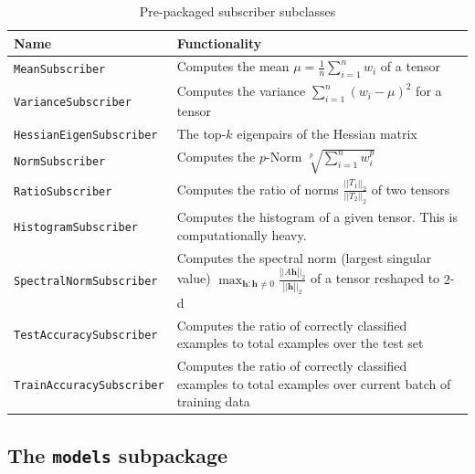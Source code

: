 \begin{table}
    \centering
    \caption{Pre-packaged subscriber subclasses}
    \label{tbl:subscribers}
    \begin{tabularx}{\textwidth}{lX}
        \toprule
        Name                             & Functionality                                                                                                                                                         \tabularnewline
        \midrule
        \texttt{MeanSubscriber}          & Computes the mean $\mu = \frac{1}{n}\sum_{i=1}^n w_i$ of a tensor                                                                                                     \tabularnewline
        \texttt{VarianceSubscriber}      & Computes the variance $\sum_{i=1}^n (w_i - \mu)^2$ for a tensor                                                                                                       \tabularnewline
        \texttt{HessianEigenSubscriber}  & The top-$k$ eigenpairs of the Hessian matrix \tabularnewline
        \texttt{NormSubscriber}          & Computes the $p$-Norm $\sqrt[p]{\sum_{i=1}^n w_i^p}$                                                                                                                  \tabularnewline
        \texttt{RatioSubscriber}         & Computes the ratio of norms $\frac{||T_1||_2}{||T_2||_2}$ of two tensors \tabularnewline
        \texttt{HistogramSubscriber}     & Computes the histogram of a given tensor. This is computationally heavy.                                                                                              \tabularnewline
        \texttt{SpectralNormSubscriber}  & Computes the spectral norm (largest singular value) $\max_{\mathbf{h}:\mathbf{h}\neq 0} \frac{\left||A\mathbf{h}\right||_2}{\left||\mathbf{h}\right||_2}$ of a tensor reshaped to $2$-d \tabularnewline
        \texttt{TestAccuracySubscriber}  & Computes the ratio of correctly classified examples to total examples over the test set                                                                               \tabularnewline
        \texttt{TrainAccuracySubscriber} & Computes the ratio of correctly classified examples to total examples over current batch of training data                                                             \tabularnewline
        \bottomrule
    \end{tabularx}
\end{table}

\hypertarget{sec:pack-models}{%
\subsection{The \texttt{models} subpackage}\label{sec:pack-models}}

